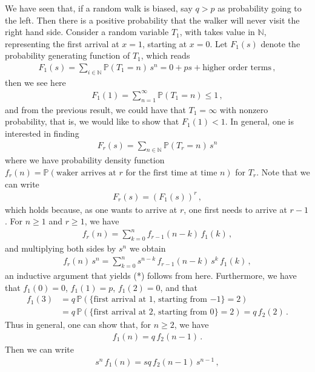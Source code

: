 \documentclass[11pt, onesided]{book}
\theoremstyle{break}
\theoremstyle{break}
\newcommand{\N}{\mathbb{N}}
\begin{document}
We have seen that, if a random walk is biased, say $q>p$ as probability going to the left. Then there is a positive probability that the walker will never visit the right hand side. Consider a random variable $T_1$, with takes value in $\N$, representing the first arrival at $x =1$, starting at $x=0$. Let $F_1(s)$ denote the probability generating function of $T_1$, which reads
\begin{align*}
F_1(s) = \sum_{i \in \N}\mathbb{P}(T_1 = n)\, s^n = 0 + ps + \text{higher order terms}\,,
\end{align*}
then we see here
\begin{align*}
F_1(1) = \sum_{n=1}^\infty \mathbb{P}(T_1 = n) \leq 1\,,
\end{align*}
and from the previous result, we could have that $T_1 = \infty$ with nonzero probability, that is, we would like to show that $F_1(1) < 1$. In general, one is interested in finding
\begin{align*}
F_r(s) = \sum_{n \in \N}\mathbb{P}(T_r = n)\,s^n
\end{align*}
where we have probability density function $f_r(n) = \mathbb{P}(\text{waker arrives at $r$ for the first time at time $n$})$ for $T_r$. Note that we can write
\begin{align*}
F_r(s) = \left( F_1(s) \right)^{r} \,, \tag{*}
\end{align*}
which holds because, as one wants to arrive at $r$, one first needs to arrive at $r-1$. For $n \geq 1$ and $r \geq 1$, we have
\begin{align*}
f_r(n) = \sum_{k=0}^n f_{r-1}(n-k) \, f_1(k) \,,
\end{align*}
and multiplying both sides by $s^n$ we obtain
\begin{align*}
f_r(n) \, s^n = \sum_{k=0}^n s^{n-k}\, f_{r-1}(n-k) \, s^k \, f_1(k)\,,
\end{align*}
an inductive argument that yields (*) follows from here. 
Furthermore, we have that $f_1(0) = 0$, $f_1(1) = p$, $f_1(2) = 0$, and that
\begin{align*}
f_1(3) &= q\, \mathbb{P}(\{\text{first arrival at 1, starting from $-1$}\} = 2) \\
&= q\, \mathbb{P}(\{\text{first arrival at 2, starting from 0}\} = 2) = q\, f_2(2)\,.
\end{align*}
Thus in general, one can show that, for $n\geq 2$, we have
\begin{align*}
f_1(n) = q\, f_2(n-1)\,.
\end{align*}
Then we can write
\begin{align*}
s^n\, f_1(n) = sq\, f_2(n-1) \, s^{n-1}\,,
\end{align*}
\end{document}
